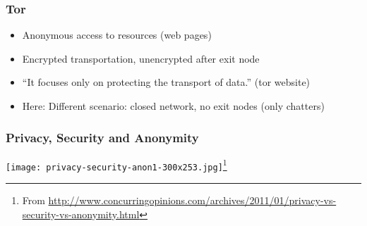 \documentclass{beamer}
\begin{document}


\frame
{
  \frametitle{Tor}
  \begin{itemize}
    \item Anonymous access to resources (web pages)
    \item Encrypted transportation, unencrypted after exit node
    \item "`It focuses only on protecting the transport of data."' (tor website)
    \item Here: Different scenario: closed network, no exit nodes (only chatters)
  \end{itemize}
}

\frame
{
  \frametitle{Privacy, Security and Anonymity}
    \begin{center}
    \texttt{[image: privacy-security-anon1-300x253.jpg]}\footnote{From \url{http://www.concurringopinions.com/archives/2011/01/privacy-vs-security-vs-anonymity.html}}
    \end{center}
}
\end{document}
